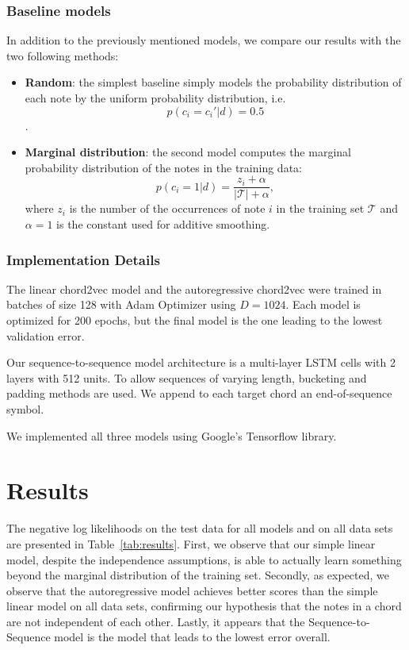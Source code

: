 \documentclass[12pt]{article}\pagestyle{myheadings}
\newcommand{\T}{\mathcal{T}}
\begin{document}
\subsubsection*{Baseline models}

In addition to the previously mentioned models, we compare our results with the two following methods:
 \begin{itemize}
 \item \textbf{Random}: the simplest baseline simply models the probability distribution of each note by the uniform probability distribution, i.e. $$p(c_i = c_i' | d ) = 0.5$$.
 \item \textbf{Marginal distribution}: the second model computes the marginal probability distribution of the notes in the training data: $$p(c_i = 1 | d )= \frac{z_i + \alpha}{|\T|+\alpha} ,$$ where $z_i$ is the number of the occurrences of note $i$ in the training set $\T$ and $\alpha = 1$ is the constant used for additive smoothing.  
 \end{itemize}

\subsubsection*{Implementation Details}
The linear chord2vec model and the autoregressive chord2vec were trained in batches of size 128 with  Adam Optimizer using $D = 1024$. Each model is optimized for 200 epochs, but the final model is the one leading to the lowest validation error.  

Our sequence-to-sequence model architecture is a multi-layer LSTM cells with 2 layers with 512 units. To allow sequences of varying length, bucketing and padding methods are used. We append to each target chord an end-of-sequence symbol.

We implemented all three models using Google's Tensorflow library.

\section*{Results}

The negative log likelihoods on the test data for all models and on all data sets are presented in Table~\ref{tab:results}. First, we observe that our simple linear model, despite the independence assumptions, is able to actually learn something beyond the marginal distribution of the training set. Secondly, as expected, we observe that the autoregressive model achieves better scores than the simple linear model on all data sets, confirming our hypothesis that the notes in a chord are not independent of each other. Lastly, it appears that the Sequence-to-Sequence model is the model that leads to the lowest error overall.   
\end{document}
